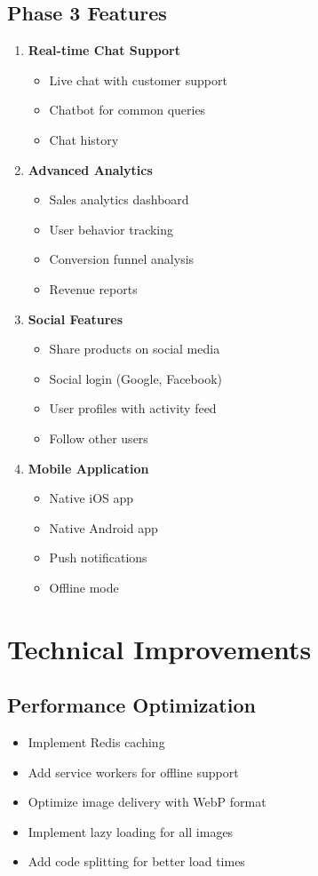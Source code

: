 \documentclass{scrreprt}
\begin{document}
\subsection{Phase 3 Features}
\begin{enumerate}
\item \textbf{Real-time Chat Support}
\begin{itemize}
\item Live chat with customer support
\item Chatbot for common queries
\item Chat history
\end{itemize}

\item \textbf{Advanced Analytics}
\begin{itemize}
\item Sales analytics dashboard
\item User behavior tracking
\item Conversion funnel analysis
\item Revenue reports
\end{itemize}

\item \textbf{Social Features}
\begin{itemize}
\item Share products on social media
\item Social login (Google, Facebook)
\item User profiles with activity feed
\item Follow other users
\end{itemize}

\item \textbf{Mobile Application}
\begin{itemize}
\item Native iOS app
\item Native Android app
\item Push notifications
\item Offline mode
\end{itemize}
\end{enumerate}

\section{Technical Improvements}

\subsection{Performance Optimization}
\begin{itemize}
\item Implement Redis caching
\item Add service workers for offline support
\item Optimize image delivery with WebP format
\item Implement lazy loading for all images
\item Add code splitting for better load times
\end{itemize}
\end{document}
